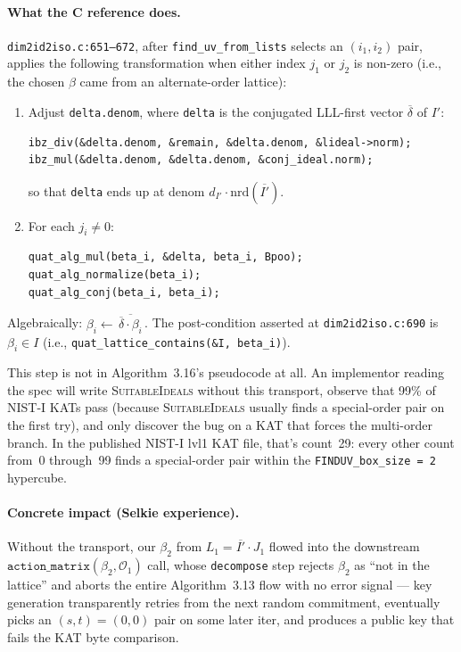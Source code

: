 \documentclass[a4paper,11pt]{article}
\newcommand{\algo}[1]{Algorithm~#1}
\begin{document}
\paragraph{What the C reference does.}
\texttt{dim2id2iso.c:651--672}, after \texttt{find\_uv\_from\_lists}
selects an $(i_1, i_2)$ pair, applies the following transformation
when either index $j_1$ or $j_2$ is non-zero (i.e., the chosen
$\beta$ came from an alternate-order lattice):
\begin{enumerate}
  \item Adjust \texttt{delta.denom}, where \texttt{delta} is the
    conjugated LLL-first vector $\overline{\delta}$ of $I'$:
\begin{verbatim}
ibz_div(&delta.denom, &remain, &delta.denom, &lideal->norm);
ibz_mul(&delta.denom, &delta.denom, &conj_ideal.norm);
\end{verbatim}
    so that \texttt{delta} ends up at denom $d_{I'} \cdot
    \mathrm{nrd}(\overline{I'})$.
  \item For each $j_i \neq 0$:
\begin{verbatim}
quat_alg_mul(beta_i, &delta, beta_i, Bpoo);
quat_alg_normalize(beta_i);
quat_alg_conj(beta_i, beta_i);
\end{verbatim}
\end{enumerate}
Algebraically: $\beta_i \leftarrow \overline{\,\overline{\delta}
\cdot \beta_i\,}$.  The post-condition asserted at
\texttt{dim2id2iso.c:690} is
$\beta_i \in I$ (i.e., \texttt{quat\_lattice\_contains(\&I,
beta\_i)}).

This step is not in \algo{3.16}'s pseudocode at all.  An
implementor reading the spec will write \textsc{SuitableIdeals}
without this transport, observe that 99\% of NIST-I KATs pass
(because \textsc{SuitableIdeals} usually finds a special-order
pair on the first try), and only discover the bug on a KAT that
forces the multi-order branch.  In the published NIST-I lvl1 KAT
file, that's count~29: every other count from~0 through~99 finds a
special-order pair within the
\texttt{FINDUV\_box\_size = 2} hypercube.

\paragraph{Concrete impact (Selkie experience).}
Without the transport, our $\beta_2$ from $L_1 = \overline{I'}
\cdot J_1$ flowed into the downstream
$\texttt{action\_matrix}(\beta_2, \mathcal{O}_1)$ call, whose
\texttt{decompose} step rejects $\beta_2$ as ``not in the
lattice'' and aborts the entire \algo{3.13} flow with no error
signal --- key generation transparently retries from the next
random commitment, eventually picks an $(s, t) = (0, 0)$ pair on
some later iter, and produces a public key that fails the KAT
byte comparison.
\end{document}
